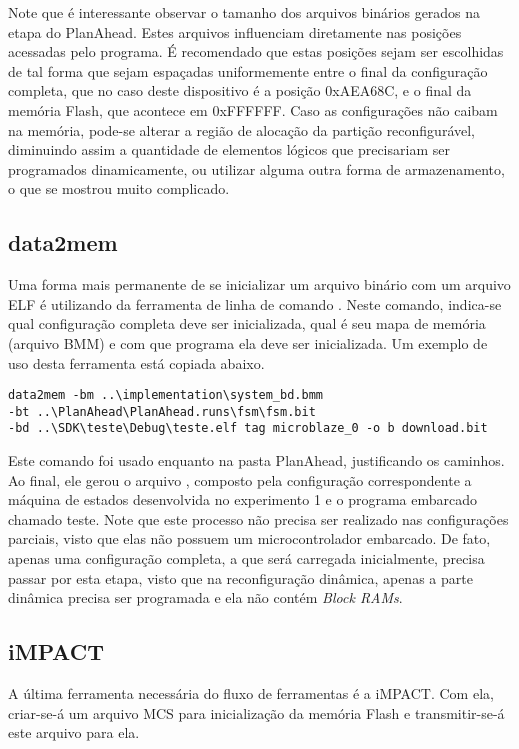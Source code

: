 \documentclass[11pt,a4paper,oneside]{book}
\begin{document}
Note que é interessante observar o tamanho dos arquivos binários gerados na etapa do PlanAhead.
Estes arquivos influenciam diretamente nas posições acessadas pelo programa.
É recomendado que estas posições sejam ser escolhidas de tal forma que sejam espaçadas uniformemente entre o final da configuração completa, que no caso deste dispositivo é a posição 0xAEA68C, e o final da memória Flash, que acontece em 0xFFFFFF.
Caso as configurações não caibam na memória, pode-se alterar a região de alocação da partição reconfigurável, diminuindo assim a quantidade de elementos lógicos que precisariam ser programados dinamicamente, ou utilizar alguma outra forma de armazenamento, o que se mostrou muito complicado.

\subsection{data2mem}
Uma forma mais permanente de se inicializar um arquivo binário com um arquivo ELF é utilizando da ferramenta de linha de comando .
Neste comando, indica-se qual configuração completa deve ser inicializada, qual é seu mapa de memória (arquivo BMM) e com que programa ela deve ser inicializada.
Um exemplo de uso desta ferramenta está copiada abaixo.
\begin{lstlisting}
data2mem -bm ..\implementation\system_bd.bmm
-bt ..\PlanAhead\PlanAhead.runs\fsm\fsm.bit
-bd ..\SDK\teste\Debug\teste.elf tag microblaze_0 -o b download.bit
\end{lstlisting}
Este comando foi usado enquanto na pasta PlanAhead, justificando os caminhos.
Ao final, ele gerou o arquivo , composto pela configuração correspondente a máquina de estados desenvolvida no experimento 1 e o programa embarcado chamado teste.
Note que este processo não precisa ser realizado nas configurações parciais, visto que elas não possuem um microcontrolador embarcado.
De fato, apenas uma configuração completa, a que será carregada inicialmente, precisa passar por esta etapa, visto que na reconfiguração dinâmica, apenas a parte dinâmica precisa ser programada e ela não contém \textit{Block RAMs}.

\subsection{iMPACT}
A última ferramenta necessária do fluxo de ferramentas é a iMPACT.
Com ela, criar-se-á um arquivo MCS para inicialização da memória Flash e transmitir-se-á este arquivo para ela.
\end{document}
